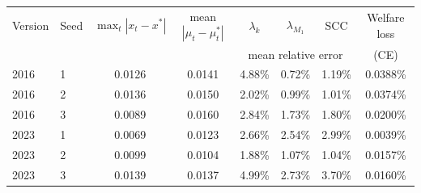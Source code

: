 \begin{tabular}{llcccccc}
\toprule
Version & Seed & $\max_t |x_t - x^*|$ & mean $|\mu_t - \mu_t^*|$ & $\lambda_k$ & $\lambda_{M_1}$ & SCC & Welfare loss \\
 & & & & \multicolumn{3}{c}{mean relative error} & (CE) \\
\midrule
2016 & 1 & 0.0126 & 0.0141 & 4.88\% & 0.72\% & 1.19\% & 0.0388\% \\
2016 & 2 & 0.0136 & 0.0150 & 2.02\% & 0.99\% & 1.01\% & 0.0374\% \\
2016 & 3 & 0.0089 & 0.0160 & 2.84\% & 1.73\% & 1.80\% & 0.0200\% \\
2023 & 1 & 0.0069 & 0.0123 & 2.66\% & 2.54\% & 2.99\% & 0.0039\% \\
2023 & 2 & 0.0099 & 0.0104 & 1.88\% & 1.07\% & 1.04\% & 0.0157\% \\
2023 & 3 & 0.0139 & 0.0137 & 4.99\% & 2.73\% & 3.70\% & 0.0160\% \\
\bottomrule
\end{tabular}
